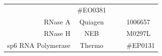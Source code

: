 \documentclass[11pt,singlespacinge,twoside]{reedthesis} %
\begin{document}
\begin{longtable}[]{@{}rccll@{}}
\begin{minipage}[t]{0.24\columnwidth}
\strut
\end{minipage} & \begin{minipage}[t]{0.11\columnwidth}\raggedright
\#EO0381\strut
\end{minipage}\tabularnewline
\begin{minipage}[t]{0.24\columnwidth}\raggedleft
RNase A\strut
\end{minipage} & \begin{minipage}[t]{0.16\columnwidth}\centering
Quiagen\strut
\end{minipage} & \begin{minipage}[t]{0.12\columnwidth}\centering
\strut
\end{minipage} & \begin{minipage}[t]{0.24\columnwidth}\raggedright
\strut
\end{minipage} & \begin{minipage}[t]{0.11\columnwidth}\raggedright
1006657\strut
\end{minipage}\tabularnewline
\begin{minipage}[t]{0.24\columnwidth}\raggedleft
RNase H\strut
\end{minipage} & \begin{minipage}[t]{0.16\columnwidth}\centering
NEB\strut
\end{minipage} & \begin{minipage}[t]{0.12\columnwidth}\centering
\strut
\end{minipage} & \begin{minipage}[t]{0.24\columnwidth}\raggedright
\strut
\end{minipage} & \begin{minipage}[t]{0.11\columnwidth}\raggedright
M0297L\strut
\end{minipage}\tabularnewline
\begin{minipage}[t]{0.24\columnwidth}\raggedleft
sp6 RNA Polymerase\strut
\end{minipage} & \begin{minipage}[t]{0.16\columnwidth}\centering
Thermo\strut
\end{minipage} & \begin{minipage}[t]{0.12\columnwidth}\centering
\strut
\end{minipage} & \begin{minipage}[t]{0.24\columnwidth}\raggedright
\strut
\end{minipage} & \begin{minipage}[t]{0.11\columnwidth}\raggedright
\#EP0131\strut
\end{minipage}\tabularnewline

\end{longtable}
\end{document}
